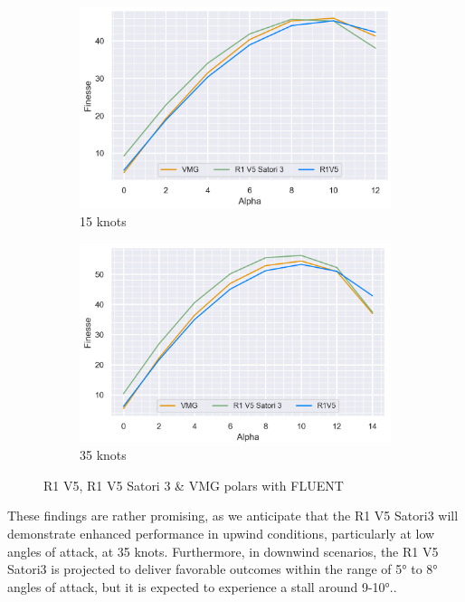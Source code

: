 \begin{figure}[H]
    \begin{subfigure}{0.5\textwidth}
    \includegraphics[width=1\textwidth]{figures/2D steady simulations/fluent/finesse VMG SAT3 R1V5 15kts FLUENT.png}
    \caption{15 knots}
    \label{fig:15 knots}
    \end{subfigure}
    \begin{subfigure}{0.5\textwidth}
    \includegraphics[width=1\textwidth]{figures/2D steady simulations/fluent/finesse VMG SAT3 R1V5 35kts FLUENT.png}
    \caption{35 knots}
    \label{fig:35 knots}
    \end{subfigure}
    \caption{R1 V5, R1 V5 Satori 3 \& VMG polars with FLUENT}
\label{fig:The R1 V5 meshing under FLUENT}
\end{figure}

These findings are rather promising, as we anticipate that the R1 V5 Satori3 will demonstrate enhanced performance in upwind conditions, particularly at low angles of attack, at 35 knots. Furthermore, in downwind scenarios, the R1 V5 Satori3 is projected to deliver favorable outcomes within the range of 5° to 8° angles of attack, but it is expected to experience a stall around 9-10°..  

